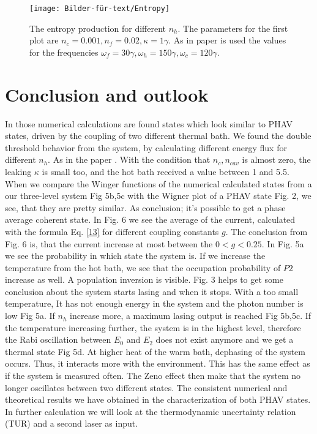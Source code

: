 \documentclass[12pt,a4paper]{article}
\begin{document}
\begin{figure}[hbtp]
\centering
\texttt{[image: Bilder-für-text/Entropy]}
\caption{The entropy production for different $n_h$. The parameters for the first plot are $n_c=0.001, n_f=0.02,\kappa=1\gamma$. As in paper \cite{Li2017} is used the values for the frequencies $\omega_f=30\gamma,\omega_h=150\gamma, \omega_c=120\gamma$.}
\end{figure}
\newpage
\section{Conclusion and outlook}
In those numerical calculations are found states which  look similar to PHAV states, driven by the coupling of two different thermal bath. We found the double threshold behavior from the system, by calculating different energy flux for different $n_h$. As in the paper \cite{Li2017}.
With the condition that $n_c, n_{cav}$ is almost zero, the leaking $\kappa$ is small too, and the hot bath received a value between 1 and 5.5. When we compare the Winger functions of the numerical calculated states from a our three-level system Fig 5b,5c with the Wigner plot of a PHAV state Fig. 2, we see, that they are pretty similar. As conclusion; it's possible to get a phase average coherent state. 
In Fig. 6 we see the average of the current, calculated with the formula Eq. \eqref{13} for different coupling constants $g$.
The conclusion from Fig. 6 is, that the current increase at most between the $ 0<g<0.25$.
In Fig. 5a we see the probability in which state the  system is. If we increase the temperature from the hot bath, we see that the occupation probability of $P2$ increase as well. A  population  inversion is visible.
Fig. 3 helps to get some conclusion about the system starts lasing and when it stops. With a too small temperature, It has not enough energy in the system and the photon number is low Fig 5a. If $n_h$ increase more, a maximum lasing output is reached  Fig 5b,5c. If the temperature increasing further, the system is in the highest level, therefore the Rabi oscillation between $E_0$ and $E_2$ does not exist anymore and we get a thermal state Fig 5d.
At higher heat of the warm bath, dephasing of the system occurs. Thus, it interacts more with the environment. This has the same effect as if the system is measured often. The Zeno effect then make that the system no longer oscillates between two different states. 
The consistent numerical and theoretical results we have obtained in the characterization of both PHAV states.
In further calculation  we will look at the thermodynamic uncertainty relation (TUR) and a second laser as input.
%
\printbibliography
\end{document}
